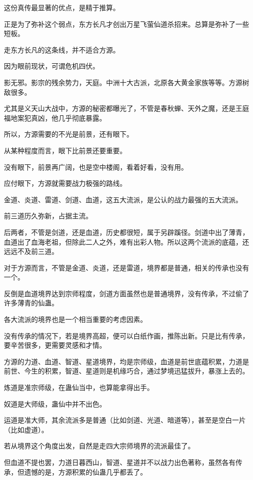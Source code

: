 \begin{this_body}
这份真传最显著的优点，是精于推算。

正是为了弥补这个弱点，东方长凡才创出万星飞萤仙道杀招来。总算是弥补了一些短板。

走东方长凡的这条线，并不适合方源。

因为眼前现状，可谓危机四伏。

影无邪。影宗的残余势力，天庭。中洲十大古派，北原各大黄金家族等等。方源树敌很多。

尤其是义天山大战中，方源的秘密都曝光了，不管是春秋蝉、天外之魔，还是王庭福地案犯真凶，他几乎彻底暴露。

所以，方源需要的不光是前景，还有眼下。

从某种程度而言，眼下比前景还要重要。

没有眼下，前景再广阔，也是空中楼阁，看着好看，没有用。

应付眼下，方源就需要战力极强的路线。

金道、炎道、雷道、剑道、血道，这五大流派，是公认的战力最强的五大流派。

前三道历久弥新，占据主流。

后两者，不管是剑道，还是血道，历史都很短，属于另辟蹊径。剑道中出了薄青，血道出了血海老祖，但除此二人之外，难有出彩人物。所以这两个流派的底蕴，还远远不及前三道。

对于方源而言，不管是金道、炎道，还是雷道，境界都是普通，相关的传承也没有一个。

反倒是血道境界达到宗师程度，剑道方面虽然也是普通境界，没有传承，不过偷了许多薄青的仙蛊。

各大流派的境界也是一个相当重要的考虑因素。

没有传承的情况下，若是境界高超，便可以白纸作画，推陈出新。只是比有传承，要辛苦很多，更需要灵感和才情。

方源的力道、血道、智道、星道境界，均是宗师级，血道是前世底蕴积累，力道是前世、今生的积累，智道、星道则是机缘巧合，通过梦境迅猛拔升，暴涨上去的。

炼道是准宗师级，在蛊仙当中，也算能拿得出手。

奴道是大师级，蛊仙中并不出色。

运道是准大师，其余流派多是普通（比如剑道、光道、暗道等），甚至是空白一片（比如虚道）。

若从境界这个角度出发，自然是走四大宗师境界的流派最佳了。

但血道不提也罢，力道日暮西山，智道、星道并不以战力出色著称，虽然各有传承，但遗憾的是，方源积累的仙蛊几乎都丢了。


\end{this_body}
